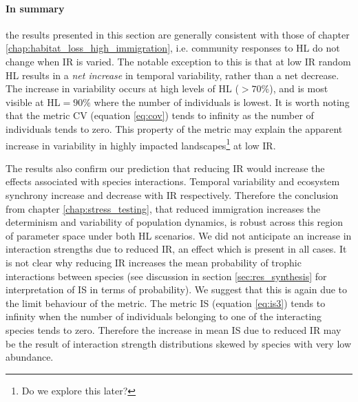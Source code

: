 \paragraph*{In summary} the results presented in this section are generally consistent with those of chapter \ref{chap:habitat_loss_high_immigration}, i.e. community responses to HL do not change when IR is varied. The notable exception to this is that at low IR random HL results in a \emph{net increase} in temporal variability, rather than a net decrease. The increase in variability occurs at high levels of HL ($>70\%$), and is most visible at HL$=90\%$ where the number of individuals is lowest. It is worth noting that the metric CV (equation \eqref{eq:cov}) tends to infinity as the number of individuals tends to zero. This property of the metric may explain the apparent increase in variability in highly impacted landscapes\footnote{Do we explore this later?} at low IR.

The results also confirm our prediction that reducing IR would increase the effects associated with species interactions. Temporal variability and ecosystem synchrony increase and decrease with IR respectively. Therefore the conclusion from chapter \ref{chap:stress_testing}, that reduced immigration increases the determinism and variability of population dynamics, is robust across this region of parameter space under both HL scenarios. We did not anticipate an increase in interaction strengths due to reduced IR, an effect which is present in all cases. It is not clear why reducing IR increases the mean probability of trophic interactions between species (see discussion in section \ref{sec:res_synthesis} for interpretation of IS in terms of probability). We suggest that this is again due to the limit behaviour of the metric. The metric IS (equation \eqref{eq:is3}) tends to infinity when the number of individuals belonging to one of the interacting species tends to zero. Therefore the increase in mean IS due to reduced IR may be the result of interaction strength distributions skewed by species with very low abundance.


